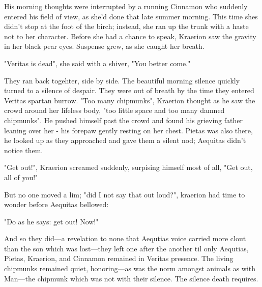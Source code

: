 His morning thoughts were interrupted by a running Cinnamon who suddenly entered his field of view, as she'd done that late summer morning. This time shes didn't stop at the foot of the birch; instead, she ran up the trunk with a haste not to her character. Before she had a chance to speak, Kraerion saw the gravity in her black pear eyes. Suspense grew, as she caught her breath.

"Veritas is dead", she said with a shiver, "You better come."


They ran back togehter, side by side. The beautiful morning silence quickly turned to a silence of despair. They were out of breath by the time they entered Veritas spartan burrow. "Too many chipmunks", Kraerion thought as he saw the crowd around her lifeless body, "too little space and too many damned chipmunks". He pushed himself past the crowd and found his grieving father leaning over her - his forepaw gently resting on her chest. Pietas was also there, he looked up as they approached and gave them a silent nod; Aequitas didn't notice them.

"Get out!", Kraerion screamed suddenly, surpising himself most of all, "Get out, all of you!"

But no one moved a lim; "did I not say that out loud?", kraerion had time to wonder before Aequitas bellowed:

"Do as he says: get out! Now!"

And so they did—a revelation to none that Aequtias voice carried more clout than the son which was lost—they left one after the another til only Aequtias, Pietas, Kraerion, and Cinnamon remained in Veritas presence. The living chipmunks remained quiet, honoring—as was the norm amongst animals as with Man—the chipmunk which was not with their silence. The silence death requires.


